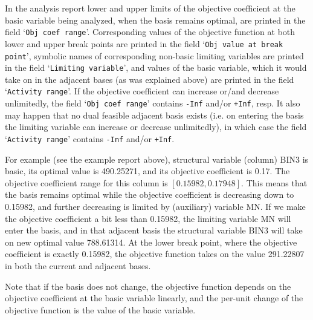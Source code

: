 {In the analysis report lower and upper limits of the objective
coefficient at the basic variable being analyzed, when the basis
remains optimal, are printed in the field `{\tt Obj coef range}'.
Corresponding values of the objective function at both lower and upper
break points are printed in the field `{\tt Obj value at break point}',
symbolic names of corresponding non-basic limiting variables are
printed in the field `{\tt Limiting variable}', and values of the basic
variable, which it would take on in the adjacent bases (as was
explained above) are printed in the field `{\tt Activity range}'.
If the objective coefficient can increase or/and decrease unlimitedly,
the field `{\tt Obj coef range}' contains {\tt -Inf} and/or {\tt +Inf},
resp. It also may happen that no dual feasible adjacent basis exists
(i.e. on entering the basis the limiting variable can increase or
decrease unlimitedly), in which case the field `{\tt Activity range}'
contains {\tt -Inf} and/or {\tt +Inf}.

For example (see the example report above), structural variable
(column) BIN3 is basic, its optimal value is 490.25271, and its
objective coefficient is 0.17. The objective coefficient range for this
column is $[0.15982,0.17948]$. This means that the basis remains
optimal while the objective coefficient is decreasing down to 0.15982,
and further decreasing is limited by (auxiliary) variable MN. If we
make the objective coefficient a bit less than 0.15982, the limiting
variable MN will enter the basis, and in that adjacent basis the
structural variable BIN3 will take on new optimal value 788.61314. At
the lower break point, where the objective coefficient is exactly
0.15982, the objective function takes on the value 291.22807 in both
the current and adjacent bases.

Note that if the basis does not change, the objective function depends
on the objective coefficient at the basic variable linearly, and the
per-unit change of the objective function is the value of the basic
variable.
}

